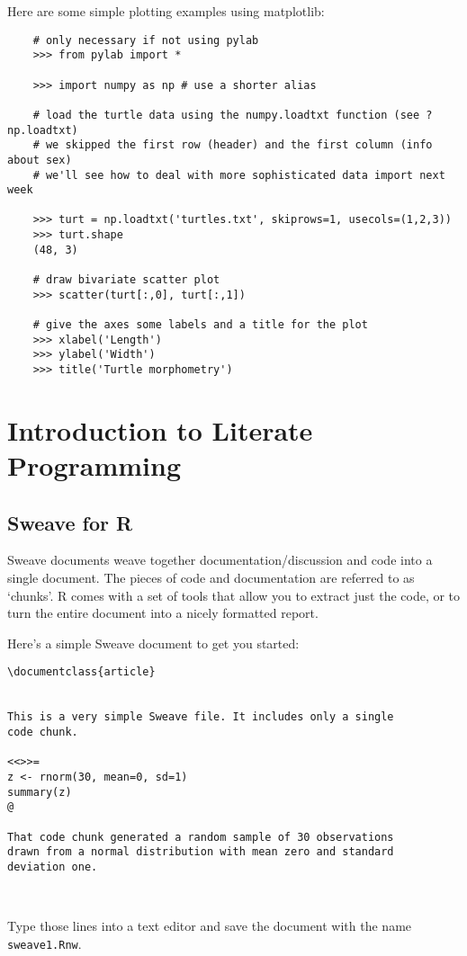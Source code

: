 Here are some simple plotting examples using matplotlib:

\begin{lstlisting}
    # only necessary if not using pylab
    >>> from pylab import * 

    >>> import numpy as np # use a shorter alias

    # load the turtle data using the numpy.loadtxt function (see ?np.loadtxt)
    # we skipped the first row (header) and the first column (info about sex)
    # we'll see how to deal with more sophisticated data import next week

    >>> turt = np.loadtxt('turtles.txt', skiprows=1, usecols=(1,2,3))
    >>> turt.shape
    (48, 3)

    # draw bivariate scatter plot
    >>> scatter(turt[:,0], turt[:,1])

    # give the axes some labels and a title for the plot
    >>> xlabel('Length')
    >>> ylabel('Width')
    >>> title('Turtle morphometry')
\end{lstlisting}
\section{Introduction to Literate Programming}

\subsection{Sweave for R}

Sweave documents weave together documentation/discussion and code into a
single document. The pieces of code and documentation are referred to as
`chunks'. R comes with a set of tools that allow you to extract just the
code, or to turn the entire document into a nicely formatted report.

Here's a simple Sweave document to get you started:

\begin{lstlisting}
\documentclass{article}


This is a very simple Sweave file. It includes only a single
code chunk.

<<>>=
z <- rnorm(30, mean=0, sd=1)
summary(z)
@

That code chunk generated a random sample of 30 observations 
drawn from a normal distribution with mean zero and standard 
deviation one.

  
\end{lstlisting}
Type those lines into a text editor and save the document with the name
\lstinline!sweave1.Rnw!.

